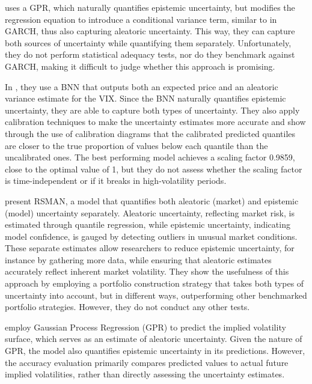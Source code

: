 \textcite{Risk2018gpr} uses a GPR, which naturally quantifies epistemic uncertainty, but modifies the regression equation to introduce a conditional variance term, similar to in GARCH, thus also capturing aleatoric uncertainty. This way, they can capture both sources of uncertainty while quantifying them separately. Unfortunately, they do not perform statistical adequacy tests, nor do they benchmark against GARCH, making it difficult to judge whether this approach is promising.

In \textcite{hortua2024forecasting}, they use a BNN that outputs both an expected price and an aleatoric variance estimate for the VIX. Since the BNN naturally quantifies epistemic uncertainty, they are able to capture both types of uncertainty. They also apply calibration techniques to make the uncertainty estimates more accurate and show through the use of calibration diagrams that the calibrated predicted quantiles are closer to the true proportion of values below each quantile than the uncalibrated ones. The best performing model achieves a scaling factor 0.9859, close to the optimal value of 1, but they do not assess whether the scaling factor is time-independent or if it breaks in high-volatility periods.


\textcite{Park2024UncertaintyAware} present RSMAN, a model that quantifies both aleatoric (market) and epistemic (model) uncertainty separately. Aleatoric uncertainty, reflecting market risk, is estimated through quantile regression, while epistemic uncertainty, indicating model confidence, is gauged by detecting outliers in unusual market conditions. These separate estimates allow researchers to reduce epistemic uncertainty, for instance by gathering more data, while ensuring that aleatoric estimates accurately reflect inherent market volatility. They show the usefulness of this approach by employing a portfolio construction strategy that takes both types of uncertainty into account, but in different ways, outperforming other benchmarked portfolio strategies. However, they do not conduct any other tests.

\textcite{tegner2021probabilistic} employ Gaussian Process Regression (GPR) to predict the implied volatility surface, which serves as an estimate of aleatoric uncertainty. Given the nature of GPR, the model also quantifies epistemic uncertainty in its predictions. However, the accuracy evaluation primarily compares predicted values to actual future implied volatilities, rather than directly assessing the uncertainty estimates.

